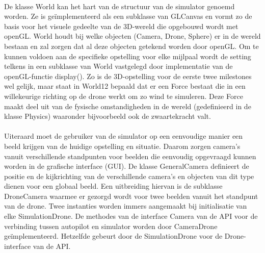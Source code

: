 \\



\noindent
De klasse World kan het hart van de structuur van de simulator genoemd worden. Ze is ge\"implementeerd als een subklasse van GLCanvas en vormt zo de basis voor het visuele gedeelte van de 3D-wereld die opgebouwd wordt met openGL. World houdt bij welke objecten (Camera, Drone, Sphere) er in de wereld bestaan en zal zorgen dat al deze objecten getekend worden door openGL. Om te kunnen voldoen aan de specifieke opstelling voor elke mijlpaal wordt de setting telkens in een subklasse van World vastgelegd door implementatie van de openGL-functie display(). Zo is de 3D-opstelling voor de eerste twee milestones wel gelijk, maar staat in World12 bepaald dat er een Force bestaat die in een willekeurige richting op de drone werkt om zo wind te simuleren. Deze Force maakt deel uit van de fysische omstandigheden in de wereld (gedefinieerd in de klasse Physics) waaronder bijvoorbeeld ook de zwaartekracht valt. \\
~\\
\noindent
Uiteraard moet de gebruiker van de simulator op een eenvoudige manier een beeld krijgen van de huidige opstelling en situatie. Daarom zorgen camera's vanuit verschillende standpunten voor beelden die eenvoudig opgevraagd kunnen worden in de grafische interface (GUI). De klasse GeneralCamera definieert de positie en de kijkrichting van de verschillende camera's en objecten van dit type dienen voor een globaal beeld. Een uitbreiding hiervan is de subklasse DroneCamera waarmee er gezorgd wordt voor twee beelden vanuit het standpunt van de drone. Twee instanties worden immers aangemaakt bij initialisatie van elke SimulationDrone. De methodes van de interface Camera van de API voor de verbinding tussen autopilot en simulator worden door CameraDrone ge\"implementeerd. Hetzelfde gebeurt door de SimulationDrone voor de Drone-interface van de API.